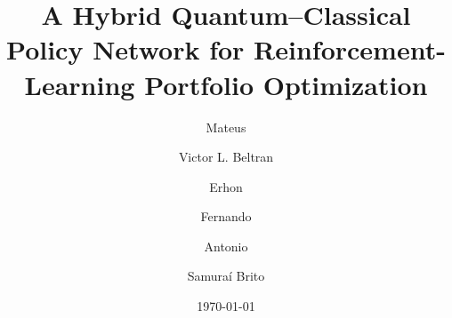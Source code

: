 \documentclass[aps,floatfix,superscriptaddress,twocolumn,tightenlines,amsmath,amssymb,nofootinbib,10pt,longbibliography,prl]{revtex4-2}
\begin{document}
\title{A Hybrid Quantum--Classical Policy Network for Reinforcement-Learning Portfolio Optimization}

\author{Mateus}

\author{Victor L. Beltran}

\author{Erhon}

\author{Fernando}

\author{Antonio }

\author{Samuraí Brito}


\date{\today}
\end{document}
